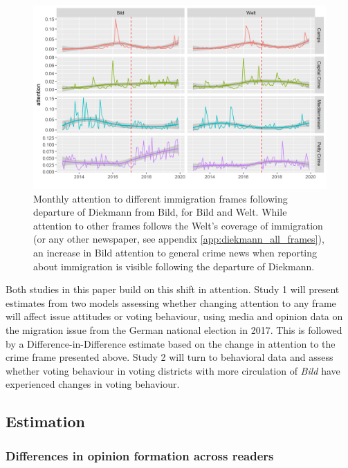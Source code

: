 \documentclass{article}
\begin{document}
\begin{figure}
    \centering
    \includegraphics[width=\textwidth]{paper/frames_bild_diekmann_pres.png}
    \caption{Monthly attention to different immigration frames following departure of Diekmann from Bild, for Bild and Welt. While attention to other frames follows the Welt's coverage of immigration (or any other newspaper, see appendix \ref{app:diekmann_all_frames}), an increase in Bild attention to general crime news when reporting about immigration is visible following the departure of Diekmann.}
    \label{fig:frames_diekmann}
\end{figure}

Both studies in this paper build on this shift in attention. Study 1 will present estimates from two models assessing whether changing attention to any frame will affect issue attitudes or voting behaviour, using media and opinion data on the migration issue from the German national election in 2017. This is followed by a Difference-in-Difference estimate based on the change in attention to the crime frame presented above. Study 2 will turn to behavioral data and assess whether voting behaviour in voting districts with more circulation of \textit{Bild} have experienced changes in voting behaviour.



\subsection{Estimation}

\subsubsection{Differences in opinion formation across readers}\label{sec:did_readers}
\end{document}

